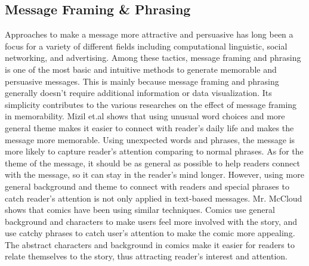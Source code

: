 \subsection{Message Framing & Phrasing}
Approaches to make a message more attractive and persuasive has long been a focus for a variety of different fields including computational linguistic, social networking, and advertising. Among these tactics, message framing and phrasing is one of the most basic and intuitive methods to generate memorable and persuasive messages. This is mainly because message framing and phrasing generally doesn't require additional information or data visualization. Its simplicity contributes to the various researches on the effect of message framing in memorability. Mizil et.al shows that using unusual word choices and more general theme makes it easier to connect with reader's daily life and makes the message more memorable. Using unexpected words and phrases, the message is more likely to capture reader's attention comparing to normal phrases. As for the theme of the message, it should be as general as possible to help readers connect with the message, so it can stay in the reader's mind longer. However, using more general background and theme to connect with readers and special phrases to catch reader's attention is not only applied in text-based messages. Mr. McCloud shows that comics have been using similar techniques. Comics use general background and characters to make users feel more involved with the story, and use catchy phrases to catch user's attention to make the comic more appealing. The abstract characters and background in comics make it easier for readers to relate themselves to the story, thus attracting reader's interest and attention.\par
